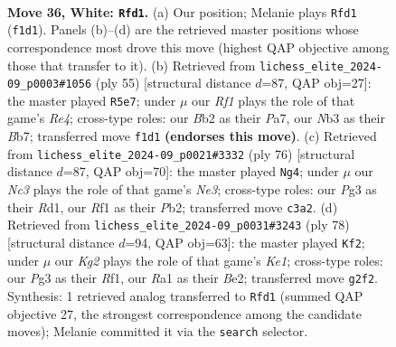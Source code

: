 \documentclass[11pt]{article}
\begin{document}
\clearpage

\begin{figure}[p]\centering
\begin{subfigure}{0.46\textwidth}\centering
\resizebox{\linewidth}{!}{%
\newchessgame
\chessboard[
  setfen={rn1b2r1/1p3b1p/1k4pP/p2pPp2/P7/1NN3P1/1B4K1/R4R2 w - - 15 36},
  showmover=false,
  pgfstyle=straightmove, color=movearrow, markmove={f1-d1}
]}
\caption{}
\end{subfigure}\hfill
\begin{subfigure}{0.46\textwidth}\centering
\resizebox{\linewidth}{!}{%
\newchessgame
\chessboard[
  setfen={4r3/pb4k1/5n2/2p1rppp/2B5/1PNRP1PP/P4K2/4R3 b - - 1 28},
  showmover=false,
  pgfstyle=straightmove, color=movearrow, markmove={e5-e7}
]}
\caption{}
\end{subfigure}
\\[4pt]
\begin{subfigure}{0.46\textwidth}\centering
\resizebox{\linewidth}{!}{%
\newchessgame
\chessboard[
  setfen={3r4/1k1rn3/1p3p2/p2pb1p1/P7/2PRN1PP/1P3BK1/3R4 w - - 9 39},
  showmover=false,
  pgfstyle=straightmove, color=movearrow, markmove={e3-g4}
]}
\caption{}
\end{subfigure}\hfill
\begin{subfigure}{0.46\textwidth}\centering
\resizebox{\linewidth}{!}{%
\newchessgame
\chessboard[
  setfen={r2r1bk1/5p2/3P3p/5NpP/p3P1P1/1b6/p2RB3/4KR2 w - - 0 40},
  showmover=false,
  pgfstyle=straightmove, color=movearrow, markmove={e1-f2}
]}
\caption{}
\end{subfigure}
\caption{\textbf{Move 36, White: \texttt{Rfd1}.} (a) Our position; Melanie plays \texttt{Rfd1} (\texttt{f1d1}). Panels (b)--(d) are the retrieved master positions whose correspondence most drove this move (highest QAP objective among those that transfer to it). (b) Retrieved from \texttt{lichess\_elite\_2024-09\_p0003\#1056} (ply 55) [structural distance $d$=87, QAP obj=27]: the master played \texttt{R5e7}; under $\mu$ our \emph{Rf1} plays the role of that game's \emph{Re4}; cross-type roles: our \emph{B}b2 as their \emph{P}a7, our \emph{N}b3 as their \emph{B}b7; transferred move \texttt{f1d1} \textbf{(endorses this move)}. (c) Retrieved from \texttt{lichess\_elite\_2024-09\_p0021\#3332} (ply 76) [structural distance $d$=87, QAP obj=70]: the master played \texttt{Ng4}; under $\mu$ our \emph{Nc3} plays the role of that game's \emph{Ne3}; cross-type roles: our \emph{P}g3 as their \emph{R}d1, our \emph{R}f1 as their \emph{P}b2; transferred move \texttt{c3a2}. (d) Retrieved from \texttt{lichess\_elite\_2024-09\_p0031\#3243} (ply 78) [structural distance $d$=94, QAP obj=63]: the master played \texttt{Kf2}; under $\mu$ our \emph{Kg2} plays the role of that game's \emph{Ke1}; cross-type roles: our \emph{P}g3 as their \emph{R}f1, our \emph{R}a1 as their \emph{B}e2; transferred move \texttt{g2f2}. Synthesis: 1 retrieved analog transferred to \texttt{Rfd1} (summed QAP objective 27, the strongest correspondence among the candidate moves); Melanie committed it via the \texttt{search} selector.}
\label{fig:thought-m70}
\end{figure}
\end{document}
